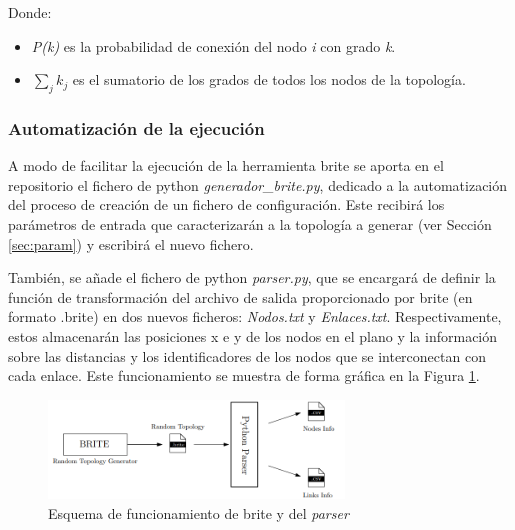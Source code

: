     Donde:
\begin{itemize}
    \renewcommand{\labelitemi}{}
    \item \textit{P(k)} es la probabilidad de conexión del nodo \textit{i} con grado \textit{k}.
    \item $\sum_{j}^{}k_j$ es el sumatorio de los grados de todos los nodos de la topología.
\end{itemize}

\subsubsection{Automatización de la ejecución}
\label{sec:brite_eje}

A modo de facilitar la ejecución de la herramienta \gls{brite} se aporta en el repositorio el fichero de python \textit{generador\_brite.py}, dedicado a la automatización del proceso de creación de un fichero de configuración. Este recibirá los parámetros de entrada que caracterizarán a la topología a generar (ver Sección \ref{sec:param}) y escribirá el nuevo fichero.

\vspace{3mm}

También, se añade el fichero de python \textit{parser.py}, que se encargará de definir la función de transformación del archivo de salida proporcionado por \gls{brite} (en formato .brite) en dos nuevos ficheros: \textit{Nodos.txt} y \textit{Enlaces.txt}. Respectivamente, estos almacenarán las posiciones x e y de los nodos en el plano y la información sobre las distancias y los identificadores de los nodos que se interconectan con cada enlace. Este funcionamiento se muestra de forma gráfica en la Figura \ref{fig:parser}.

\vspace{3mm}

\begin{figure}[H]
    \centering
    \includegraphics[width=0.7\textwidth]{img/teoria/parser.png}
    \caption{Esquema de funcionamiento de \acrshort{brite} y del \textit{parser} \cite{den2ne}}
    \label{fig:parser}
\end{figure}

